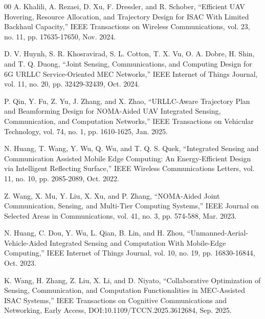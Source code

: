 \documentclass[10pt,journal,compsoc]{IEEEtran}
\begin{document}
\begin{thebibliography}{00}
A. Khalili, A. Rezaei, D. Xu, F. Dressler, and R. Schober,
``Efficient UAV Hovering, Resource Allocation, and Trajectory Design for ISAC With Limited Backhaul Capacity,''
IEEE Transactions on Wireless Communications, vol. 23, no. 11, pp. 17635-17650, Nov. 2024.

D. V. Huynh, S. R. Khosravirad, S. L. Cotton, T. X. Vu, O. A. Dobre, H. Shin, and T. Q. Duong,
``Joint Sensing, Communications, and Computing Design for 6G URLLC Service-Oriented MEC Networks,''
IEEE Internet of Things Journal, vol. 11, no. 20, pp. 32429-32439, Oct. 2024.

P. Qin, Y. Fu, Z. Yu, J. Zhang, and X. Zhao,
``URLLC-Aware Trajectory Plan and Beamforming Design for NOMA-Aided UAV Integrated Sensing, Communication, and Computation Networks,''
IEEE Transactions on Vehicular Technology, vol. 74, no. 1, pp. 1610-1625, Jan. 2025.

N. Huang, T. Wang, Y. Wu, Q. Wu, and T. Q. S. Quek,
``Integrated Sensing and Communication Assisted Mobile Edge Computing: An Energy-Efficient Design via Intelligent Reflecting Surface,''
IEEE Wireless Communications Letters, vol. 11, no. 10, pp. 2085-2089, Oct. 2022.

Z. Wang, X. Mu, Y. Liu, X. Xu, and P. Zhang,
``NOMA-Aided Joint Communication, Sensing, and Multi-Tier Computing Systems,''
IEEE Journal on Selected Areas in Communications, vol. 41, no. 3, pp. 574-588, Mar. 2023.


N. Huang, C. Dou, Y. Wu, L. Qian, B. Lin, and H. Zhou,
``Unmanned-Aerial-Vehicle-Aided Integrated Sensing and Computation With Mobile-Edge Computing,''
IEEE Internet of Things Journal, vol. 10, no. 19, pp. 16830-16844, Oct. 2023.

K. Wang, H. Zhang, Z. Liu, X. Li, and D. Niyato,
``Collaborative Optimization of Sensing, Communication, and Computation Functionalities in MEC-Assisted ISAC Systems,''
IEEE Transactions on Cognitive Communications and Networking, Early Access, DOI:10.1109/TCCN.2025.3612684, Sep. 2025.


\end{thebibliography}
\end{document}
